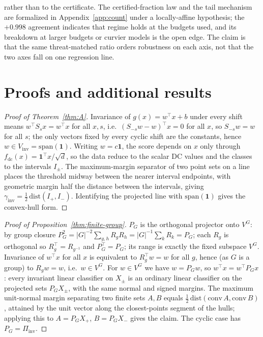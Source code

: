 \documentclass{article}
\theoremstyle{definition}
\newcommand{\fdc}{f_{\mathrm{dc}}}
\newcommand{\Vinv}{V_{\mathrm{inv}}}
\newcommand{\dd}{d}
\begin{document}
rather than to the certificate. The certified-fraction law and the tail mechanism are formalized in Appendix~\ref{app:count} under a locally-affine hypothesis; the $+0.998$ agreement indicates that regime holds at the budgets used, and its breakdown at larger budgets or curvier models is the open edge. The claim is that the same threat-matched ratio orders robustness on each axis, not that the two axes fall on one regression line.




\appendix
\section{Proofs and additional results}\label{app:proofs}

\begin{proof}[Proof of Theorem~\ref{thm:A}]
Invariance of $g(x)=w^\top x+b$ under every shift means $w^\top S_s x=w^\top x$ for all $x,s$, i.e.\ $(S_{-s}w-w)^\top x=0$ for all $x$, so $S_{-s}w=w$ for all $s$; the only vectors fixed by every cyclic shift are the constants, hence $w\in\Vinv=\mathrm{span}(\mathbf 1)$. Writing $w=c\mathbf 1$, the score depends on $x$ only through $\fdc(x)=\mathbf 1^\top x/\sqrt\dd$, so the data reduce to the scalar DC values and the classes to the intervals $I_\pm$. The maximum-margin separator of two point sets on a line places the threshold midway between the nearer interval endpoints, with geometric margin half the distance between the intervals, giving $\gamma_{\mathrm{inv}}=\tfrac12\,\mathrm{dist}(I_+,I_-)$. Identifying the projected line with $\mathrm{span}(\mathbf 1)$ gives the convex-hull form.
\end{proof}

\begin{proof}[Proof of Proposition~\ref{thm:finite-group}]
$P_G$ is the orthogonal projector onto $V^G$: by group closure $P_G^2=|G|^{-2}\sum_{g,h}R_gR_h=|G|^{-1}\sum_k R_k=P_G$; each $R_g$ is orthogonal so $R_g^\top=R_{g^{-1}}$ and $P_G^\top=P_G$; its range is exactly the fixed subspace $V^G$. Invariance of $w^\top x$ for all $x$ is equivalent to $R_g^\top w=w$ for all $g$, hence (as $G$ is a group) to $R_g w=w$, i.e.\ $w\in V^G$. For $w\in V^G$ we have $w=P_Gw$, so $w^\top x=w^\top P_Gx$: every invariant linear classifier on $X_\pm$ is an ordinary linear classifier on the projected sets $P_GX_\pm$, with the same normal and signed margins. The maximum unit-normal margin separating two finite sets $A,B$ equals $\tfrac12\,\mathrm{dist}(\mathrm{conv}\,A,\mathrm{conv}\,B)$, attained by the unit vector along the closest-points segment of the hulls; applying this to $A=P_GX_+$, $B=P_GX_-$ gives the claim. The cyclic case has $P_G=\Pi_{\mathrm{inv}}$.
\end{proof}
\end{document}
